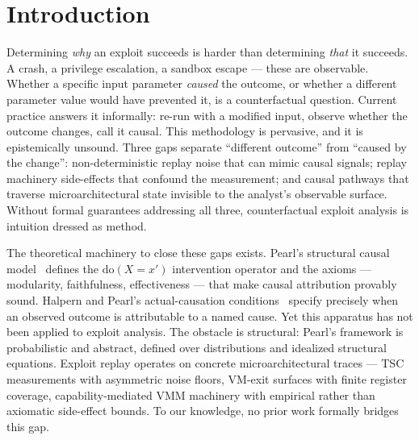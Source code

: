 \documentclass[conference]{IEEEtran}
\newcommand{\dox}[1]{\text{do}(X{=}#1)}
\begin{document}
\section{Introduction}\label{sec:intro}

Determining \emph{why} an exploit succeeds is harder than determining
\emph{that} it succeeds. A crash, a privilege escalation, a sandbox
escape --- these are observable. Whether a specific input parameter
\emph{caused} the outcome, or whether a different parameter value
would have prevented it, is a counterfactual question. Current
practice answers it informally: re-run with a modified input, observe
whether the outcome changes, call it causal. This methodology is
pervasive, and it is epistemically unsound. Three gaps separate
``different outcome'' from ``caused by the change'':
non-deterministic replay noise that can mimic causal signals; replay
machinery side-effects that confound the measurement; and causal
pathways that traverse microarchitectural state invisible to the
analyst's observable surface. Without formal guarantees addressing
all three, counterfactual exploit analysis is intuition dressed as
method.

The theoretical machinery to close these gaps exists. Pearl's
structural causal model~\cite{pearl2009causality} defines the
$\dox{x'}$ intervention operator and the axioms --- modularity,
faithfulness, effectiveness --- that make causal attribution provably
sound. Halpern and Pearl's actual-causation
conditions~\cite{halpern2005causes} specify precisely when an
observed outcome is attributable to a named cause. Yet this apparatus
has not been applied to exploit analysis. The obstacle is structural:
Pearl's framework is probabilistic and abstract, defined over
distributions and idealized structural equations. Exploit replay
operates on concrete microarchitectural traces --- TSC measurements
with asymmetric noise floors, VM-exit surfaces with finite register
coverage, capability-mediated VMM machinery with empirical rather
than axiomatic side-effect bounds. To our knowledge, no prior work
formally bridges this gap.
\end{document}
